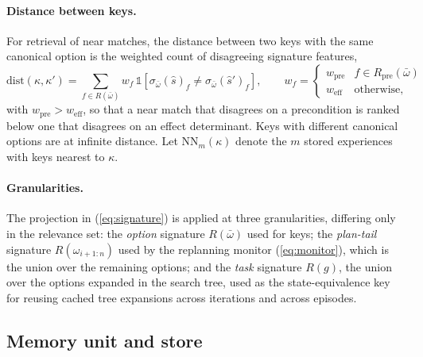 \documentclass[11pt]{article}
\newcommand{\Rel}{R}
\newcommand{\shat}{\hat{s}}
\newcommand{\dist}{\mathrm{dist}}
\begin{document}
\paragraph{Distance between keys.}
For retrieval of near matches, the distance between two keys with the same canonical option is the weighted count of disagreeing signature features,
\begin{equation}
\dist(\kappa,\kappa')=\textstyle\sum_{f\in\Rel(\bar\omega)}w_f\,\mathbb{1}[\sigma_{\bar\omega}(\shat)_f\ne\sigma_{\bar\omega}(\shat')_f],
\qquad w_f=\begin{cases}w_{\mathrm{pre}} & f\in\Rel_{\mathrm{pre}}(\bar\omega)\\ w_{\mathrm{eff}} & \text{otherwise},\end{cases}
\label{eq:key-dist}
\end{equation}
with $w_{\mathrm{pre}}>w_{\mathrm{eff}}$, so that a near match that disagrees on a precondition is ranked below one that disagrees on an effect determinant. Keys with different canonical options are at infinite distance. Let $\mathrm{NN}_m(\kappa)$ denote the $m$ stored experiences with keys nearest to $\kappa$.

\paragraph{Granularities.}
The projection in (\ref{eq:signature}) is applied at three granularities, differing only in the relevance set: the \emph{option} signature $\Rel(\bar\omega)$ used for keys; the \emph{plan-tail} signature $\Rel(\omega_{i+1:n})$ used by the replanning monitor (\ref{eq:monitor}), which is the union over the remaining options; and the \emph{task} signature $\Rel(g)$, the union over the options expanded in the search tree, used as the state-equivalence key for reusing cached tree expansions across iterations and across episodes.

\subsection{Memory unit and store}
\label{sec:type2-unit}
\end{document}
